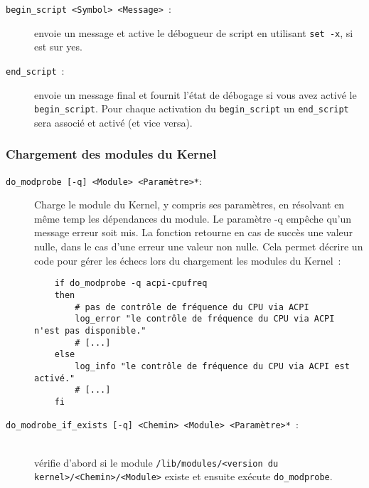 \begin{description}

\item[\texttt{begin\_script <Symbol> <Message>}~:] envoie un message et active
le débogueur de script en utilisant \texttt{set -x}, si 
est sur \og{}yes\fg{}.

\item[\texttt{end\_script}~:] envoie un message final et fournit l'état de débogage
si vous avez activé le \texttt{begin\_script}. Pour chaque activation du \texttt{begin\_script}
un \texttt{end\_script} sera associé et activé (et vice versa).

\end{description}


\subsubsection{Chargement des modules du Kernel}

\begin{description}

\item[\texttt{do\_modprobe [-q] <Module> <Paramètre>*}:]
Charge le module du Kernel, y compris ses paramètres, en résolvant en même temp
les dépendances du module. Le paramètre \og{}-q\fg{} empêche qu'un message erreur
soit mis. La fonction retourne en cas de succès une valeur nulle, dans le cas
d'une erreur une valeur non nulle. Cela permet décrire un code pour gérer les échecs
lors du chargement les modules du Kernel~:

\begin{example}
\begin{verbatim}
    if do_modprobe -q acpi-cpufreq
    then
        # pas de contrôle de fréquence du CPU via ACPI
        log_error "le contrôle de fréquence du CPU via ACPI n'est pas disponible."
        # [...]
    else
        log_info "le contrôle de fréquence du CPU via ACPI est activé."
        # [...]
    fi
\end{verbatim}
\end{example}

\item[\texttt{do\_modrobe\_if\_exists [-q] <Chemin> <Module> <Paramètre>*}~:]\mbox{}\\
vérifie d'abord si le module \texttt{/lib/modules/<version du kernel>/<Chemin>/<Module>}
existe et ensuite exécute \texttt{do\_modprobe}.


\end{description}



